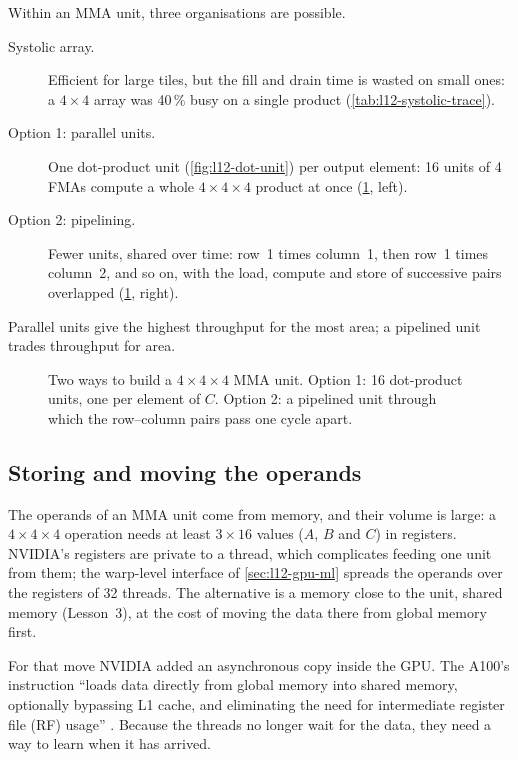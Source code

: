 \documentclass[../main.tex]{subfiles}
\begin{document}
Within an MMA unit, three organisations are possible.
\begin{description}
  \item[Systolic array.]  Efficient for large tiles, but the fill and
    drain time is wasted on small ones: a $4 \times 4$ array was 40\,\%
    busy on a single product (\cref{tab:l12-systolic-trace}).
  \item[Option 1: parallel units.]  One dot-product unit
    (\cref{fig:l12-dot-unit}) per output element: 16 units of 4 FMAs
    compute a whole $4 \times 4 \times 4$ product at once
    (\cref{fig:l12-mma-options}, left).
  \item[Option 2: pipelining.]  Fewer units, shared over time: row~1
    times column~1, then row~1 times column~2, and so on, with the load,
    compute and store of successive pairs overlapped
    (\cref{fig:l12-mma-options}, right).
\end{description}
Parallel units give the highest throughput for the most area; a
pipelined unit trades throughput for area.

\begin{figure}[tb]
  \centering
  
  \caption{Two ways to build a $4 \times 4 \times 4$ MMA unit.  Option 1:
    16 dot-product units, one per element of $C$.  Option 2: a pipelined
    unit through which the row--column pairs pass one cycle apart.}
  \label{fig:l12-mma-options}
\end{figure}

\subsection{Storing and moving the operands}

The operands of an MMA unit come from memory, and their volume is
large: a $4 \times 4 \times 4$ operation needs at least
$3 \times 16$ values ($A$, $B$ and $C$) in registers.  NVIDIA's
registers are private to a thread, which complicates feeding one unit
from them; the warp-level interface of \cref{sec:l12-gpu-ml} spreads
the operands over the registers of 32 threads.  The alternative is a
memory close to the unit, shared memory (Lesson~3), at the cost of
moving the data there from global memory first.

For that move NVIDIA added an asynchronous copy inside the GPU.  The
A100's instruction \enquote{loads data directly from global memory into
shared memory, optionally bypassing L1 cache, and eliminating the need
for intermediate register file (RF) usage}
\cite{nvidia2020ampere}.  Because the threads no
longer wait for the data, they need a way to learn when it has
arrived.
\end{document}

